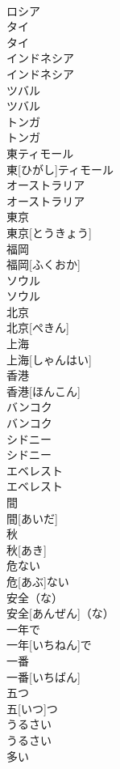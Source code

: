 \documentclass[8pt]{extreport}
\begin{document}
\begin{CJK}{UTF8}{min}
\\	ロシア		
\\	タイ	
\\	タイ		
\\	インドネシア	
\\	インドネシア		
\\	ツバル	
\\	ツバル		
\\	トンガ	
\\	トンガ		
\\	東ティモール	
\\	東[ひがし]ティモール		
\\	オーストラリア	
\\	オーストラリア		
\\	東京	
\\	東京[とうきょう]		
\\	福岡	
\\	福岡[ふくおか]		
\\	ソウル	
\\	ソウル		
\\	北京	
\\	北京[ぺきん]		
\\	上海	
\\	上海[しゃんはい]		
\\	香港	
\\	香港[ほんこん]		
\\	バンコク	
\\	バンコク		
\\	シドニー	
\\	シドニー		
\\	エベレスト	
\\	エベレスト		
\\	間	
\\	間[あいだ]		
\\	秋	
\\	秋[あき]		
\\	危ない	
\\	危[あぶ]ない		
\\	安全（な）	
\\	安全[あんぜん]（な）		
\\	一年で	
\\	一年[いちねん]で		
\\	一番	
\\	一番[いちばん]		
\\	五つ	
\\	五[いつ]つ		
\\	うるさい	
\\	うるさい		
\\	多い	

\end{CJK}
\end{document}
